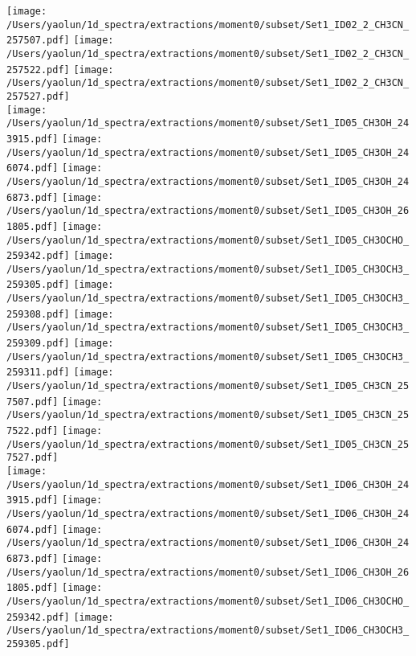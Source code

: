 \begin{figure*}[htbp!]
  \texttt{[image: /Users/yaolun/1d\_spectra/extractions/moment0/subset/Set1\_ID02\_2\_CH3CN\_257507.pdf]}
  \texttt{[image: /Users/yaolun/1d\_spectra/extractions/moment0/subset/Set1\_ID02\_2\_CH3CN\_257522.pdf]}
  \texttt{[image: /Users/yaolun/1d\_spectra/extractions/moment0/subset/Set1\_ID02\_2\_CH3CN\_257527.pdf]}
  \\
  \texttt{[image: /Users/yaolun/1d\_spectra/extractions/moment0/subset/Set1\_ID05\_CH3OH\_243915.pdf]}
  \texttt{[image: /Users/yaolun/1d\_spectra/extractions/moment0/subset/Set1\_ID05\_CH3OH\_246074.pdf]}
  \texttt{[image: /Users/yaolun/1d\_spectra/extractions/moment0/subset/Set1\_ID05\_CH3OH\_246873.pdf]}
  \texttt{[image: /Users/yaolun/1d\_spectra/extractions/moment0/subset/Set1\_ID05\_CH3OH\_261805.pdf]}
  \texttt{[image: /Users/yaolun/1d\_spectra/extractions/moment0/subset/Set1\_ID05\_CH3OCHO\_259342.pdf]}
  \texttt{[image: /Users/yaolun/1d\_spectra/extractions/moment0/subset/Set1\_ID05\_CH3OCH3\_259305.pdf]}
  \texttt{[image: /Users/yaolun/1d\_spectra/extractions/moment0/subset/Set1\_ID05\_CH3OCH3\_259308.pdf]}
  \texttt{[image: /Users/yaolun/1d\_spectra/extractions/moment0/subset/Set1\_ID05\_CH3OCH3\_259309.pdf]}
  \texttt{[image: /Users/yaolun/1d\_spectra/extractions/moment0/subset/Set1\_ID05\_CH3OCH3\_259311.pdf]}
  \texttt{[image: /Users/yaolun/1d\_spectra/extractions/moment0/subset/Set1\_ID05\_CH3CN\_257507.pdf]}
  \texttt{[image: /Users/yaolun/1d\_spectra/extractions/moment0/subset/Set1\_ID05\_CH3CN\_257522.pdf]}
  \texttt{[image: /Users/yaolun/1d\_spectra/extractions/moment0/subset/Set1\_ID05\_CH3CN\_257527.pdf]}
  \\
  \texttt{[image: /Users/yaolun/1d\_spectra/extractions/moment0/subset/Set1\_ID06\_CH3OH\_243915.pdf]}
  \texttt{[image: /Users/yaolun/1d\_spectra/extractions/moment0/subset/Set1\_ID06\_CH3OH\_246074.pdf]}
  \texttt{[image: /Users/yaolun/1d\_spectra/extractions/moment0/subset/Set1\_ID06\_CH3OH\_246873.pdf]}
  \texttt{[image: /Users/yaolun/1d\_spectra/extractions/moment0/subset/Set1\_ID06\_CH3OH\_261805.pdf]}
  \texttt{[image: /Users/yaolun/1d\_spectra/extractions/moment0/subset/Set1\_ID06\_CH3OCHO\_259342.pdf]}
  \texttt{[image: /Users/yaolun/1d\_spectra/extractions/moment0/subset/Set1\_ID06\_CH3OCH3\_259305.pdf]}

\end{figure*}
